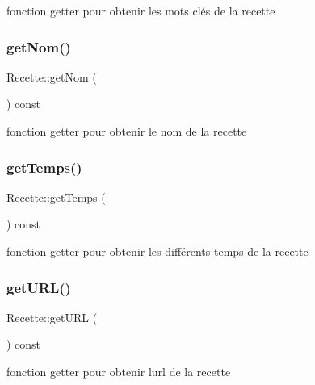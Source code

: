 fonction getter pour obtenir les mots clés de la recette 

\mbox{\label{classRecette_afab5d7deab9130137037872a7a42ef3c}} 
\subsubsection{\texorpdfstring{get\+Nom()}{getNom()}}
{\footnotesize\ttfamily Recette\+::get\+Nom (\begin{DoxyParamCaption}{ }\end{DoxyParamCaption}) const}



fonction getter pour obtenir le nom de la recette 

\mbox{\label{classRecette_a9ac38f333d17699fb6601bca332d8567}} 
\subsubsection{\texorpdfstring{get\+Temps()}{getTemps()}}
{\footnotesize\ttfamily Recette\+::get\+Temps (\begin{DoxyParamCaption}{ }\end{DoxyParamCaption}) const}



fonction getter pour obtenir les différents temps de la recette 

\mbox{\label{classRecette_ab06006324a8201e9967b53273dbf2751}} 
\subsubsection{\texorpdfstring{get\+U\+R\+L()}{getURL()}}
{\footnotesize\ttfamily Recette\+::get\+U\+RL (\begin{DoxyParamCaption}{ }\end{DoxyParamCaption}) const}



fonction getter pour obtenir l\textquotesingle{}url de la recette 

\mbox{\label{classRecette_ad8e3af91743c2509d82983f5da803186}} 
